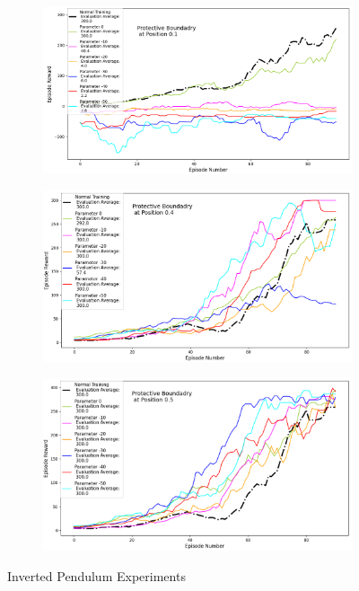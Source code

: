 \documentclass[journal]{IEEEtran}
\begin{document}
\begin{figure}
    \centering
    \begin{subfigure}[b]{0.5\textwidth}
      \centering
      \includegraphics[width=\textwidth]{Inverted_Pendulum_with_Boundary_at_0.1.png}
    \end{subfigure}
    \vspace*{0.0mm}
    \begin{subfigure}[b]{0.5\textwidth}
      \centering
      \includegraphics[width=\textwidth]{Inverted_Pendulum_with_Boundary_at_0.4.png}
    \end{subfigure}
    \vspace*{0.0mm}
    \begin{subfigure}[b]{0.5\textwidth}
      \centering
      \includegraphics[width=\textwidth]{Inverted_Pendulum_with_Boundary_at_0.5.png}
    \end{subfigure}
    \caption{Inverted Pendulum Experiments}
    \label{fig:InvertedPendulum}
\end{figure}
\end{document}
